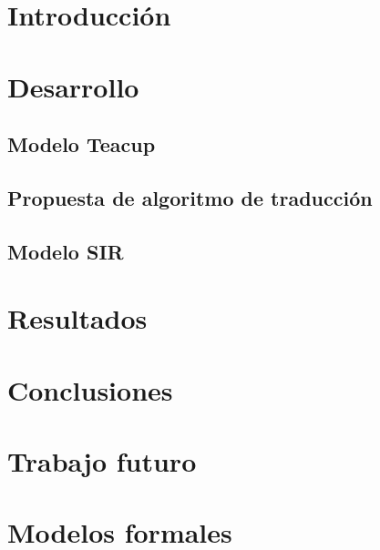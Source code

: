 \documentclass[11pt, a4paper]{article}
\begin{document}

\maketitle
\newpage

\tableofcontents
\newpage

%
\section{Introducción}


\section{Desarrollo}

\subsection{Modelo Teacup}

\subsection{Propuesta de algoritmo de traducción}


\subsection{Modelo SIR}


\section{Resultados}


\section{Conclusiones}


\section{Trabajo futuro}


\clearpage
\addappheadtotoc
\appendix
\appendixpage

\section{Modelos formales}



\end{document}
